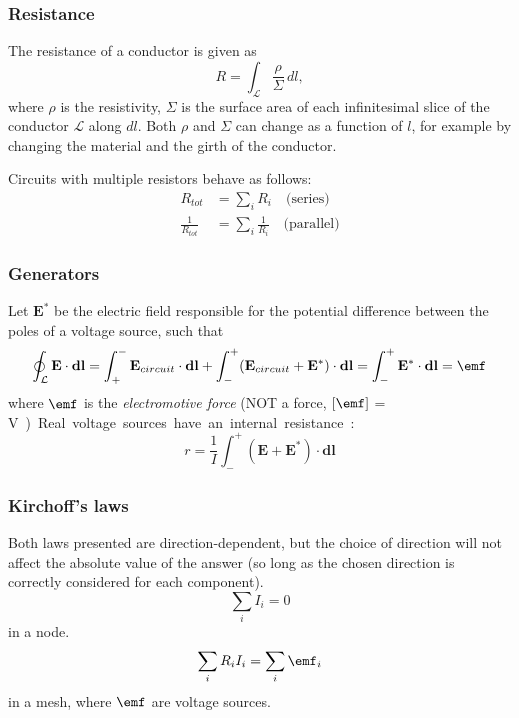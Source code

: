 \documentclass[a4paper, 12pt]{article}
\renewcommand{\vec}[1]{\mathbf{#1}}
\newcommand{\E}{\ensuremath{\vec{E}}}
\begin{document}
    \subsubsection{Resistance}
        The resistance of a conductor is given as
        \begin{equation}
            R = \int_\mathcal{L} \frac{\rho}{\Sigma}\,dl,
        \end{equation}
        where $\rho$ is the resistivity, 
        $\Sigma$ is the surface area of each infinitesimal slice of the conductor $\mathcal{L}$ along $dl$. 
        Both $\rho$ and $\Sigma$ can change as a function of $l$, for example by changing the material and the girth of the conductor.
        
        Circuits with multiple resistors behave as follows: 
        \begin{align}
            R_{tot} &= \sum_i R_i\quad \text{(series)} \\
            \frac{1}{R_{tot}} &= \sum_i \frac{1}{R_i} \quad\text{(parallel)}
        \end{align}
        
    \subsubsection{Generators}
        Let $\E^*$ be the electric field responsible for the potential difference between the poles of a voltage source, such that
        \begin{equation}
            \oint_\mathcal{L} \E\cdot \vec{dl} = \int_+^-\E_{circuit}\cdot \vec{dl} + \int_-^+(\E_{circuit} + \E^*)\cdot \vec{dl} = \int_-^+\E^*\cdot \vec{dl} = \emf
        \end{equation}
        where $\emf$ is the \textit{electromotive force} (NOT a force, $\left[\emf\right]$ = \si\volt)
        
        Real voltage sources have an internal resistance:
        \begin{equation}
            r = \frac{1}{I}\int_-^+(\E + \E^*)\cdot\vec{dl}
        \end{equation}
        
    \subsubsection{Kirchoff's laws}
        Both laws presented are direction-dependent, 
        but the choice of direction will not affect the absolute value of the answer 
        (so long as the chosen direction is correctly considered for each component). 
        \begin{equation}
            \sum_i I_i = 0
        \end{equation}
        in a node.
        \begin{equation}
            \sum_i R_iI_i = \sum_i \emf_i
        \end{equation}
        in a mesh, where $\emf$ are voltage sources. 
\end{document}

